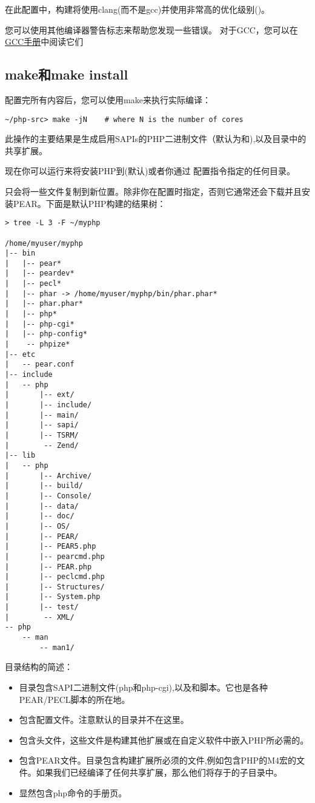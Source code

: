在此配置中，构建将使用clang(而不是gcc)并使用非常高的优化级别()。

您可以使用其他编译器警告标志来帮助您发现一些错误。 对于GCC，您可以在\href{https://gcc.gnu.org/onlinedocs/gcc/Warning-Options.html#Warning-Options}{GCC手册}中阅读它们


\subsection{make和make install}

配置完所有内容后，您可以使用make来执行实际编译：

\begin{lstlisting}[language=shell]
~/php-src> make -jN    # where N is the number of cores
\end{lstlisting}

此操作的主要结果是生成启用SAPIs的PHP二进制文件（默认为和),以及目录中的共享扩展。

现在你可以运行来将安装PHP到(默认)或者你通过 配置指令指定的任何目录。


只会将一些文件复制到新位置。除非你在配置时指定，否则它通常还会下载并且安装PEAR。下面是默认PHP构建的结果树：

\begin{lstlisting}
> tree -L 3 -F ~/myphp

/home/myuser/myphp
|-- bin
|   |-- pear*
|   |-- peardev*
|   |-- pecl*
|   |-- phar -> /home/myuser/myphp/bin/phar.phar*
|   |-- phar.phar*
|   |-- php*
|   |-- php-cgi*
|   |-- php-config*
|    -- phpize*
|-- etc
|   -- pear.conf
|-- include
|   -- php
|       |-- ext/
|       |-- include/
|       |-- main/
|       |-- sapi/
|       |-- TSRM/
|        -- Zend/
|-- lib
|   -- php
|       |-- Archive/
|       |-- build/
|       |-- Console/
|       |-- data/
|       |-- doc/
|       |-- OS/
|       |-- PEAR/
|       |-- PEAR5.php
|       |-- pearcmd.php
|       |-- PEAR.php
|       |-- peclcmd.php
|       |-- Structures/
|       |-- System.php
|       |-- test/
|        -- XML/
-- php
    -- man
        -- man1/
\end{lstlisting}

目录结构的简述：

\begin{itemize}
    \item {}目录包含SAPI二进制文件(php和php-cgi),以及和脚本。它也是各种PEAR/PECL脚本的所在地。
    \item {}包含配置文件。注意默认的目录并不在这里。
    \item {}包含头文件，这些文件是构建其他扩展或在自定义软件中嵌入PHP所必需的。
    \item {}包含PEAR文件。目录包含构建扩展所必须的文件,例如包含PHP的M4宏的文件。如果我们已经编译了任何共享扩展，那么他们将存于的子目录中。
    \item {} 显然包含php命令的手册页。
\end{itemize}

